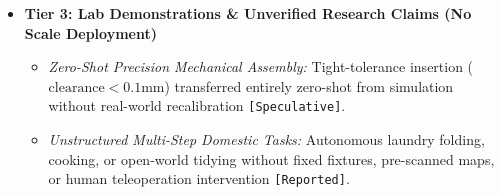 \documentclass[11pt,a4paper]{article}
\begin{document}
\begin{itemize}
    \item \textbf{Tier 3: Lab Demonstrations \& Unverified Research Claims (No Scale Deployment)}
    \begin{itemize}
        \item \textit{Zero-Shot Precision Mechanical Assembly:} Tight-tolerance insertion ($\text{clearance} < 0.1\text{mm}$) transferred entirely zero-shot from simulation without real-world recalibration \texttt{[Speculative]}.
        \item \textit{Unstructured Multi-Step Domestic Tasks:} Autonomous laundry folding, cooking, or open-world tidying without fixed fixtures, pre-scanned maps, or human teleoperation intervention \texttt{[Reported]}.
    \end{itemize}
\end{itemize}
\end{document}
